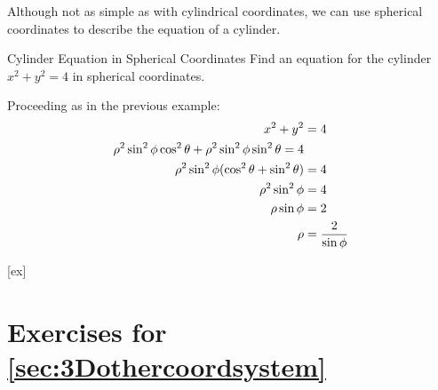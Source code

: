 Although not as simple as with cylindrical coordinates, we can use spherical coordinates to describe the equation of a cylinder.

\begin{example}{Cylinder Equation in Spherical Coordinates}{}
Find an equation for the cylinder $x^2+y^2=4$ in spherical
coordinates.
\end{example}
\begin{solution}
Proceeding as in the previous example:
\begin{align*}
  x^2+y^2&=4	\\
  \rho^2\sin^2\phi\cos^2\theta+
     \rho^2\sin^2\phi\sin^2\theta=4	\\
  \rho^2\sin^2\phi(\cos^2\theta+\sin^2\theta)&=4	\\
  \rho^2\sin^2\phi&=4	\\
  \rho\sin\phi&=2	\\
  \rho&={2\over\sin\phi}
\end{align*}
\end{solution}


[ex]
\section*{Exercises for \ref{sec:3Dothercoordsystem}}

